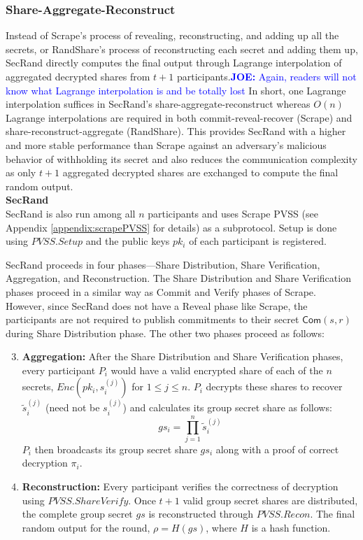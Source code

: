 \documentclass[letterpaper,twocolumn,10pt]{article}
\theoremstyle{definition}
\theoremstyle{remark}
\newcommand{\joenote}[1]{\textcolor{blue}{\textbf{JOE:} #1}}
\begin{document}
\subsubsection{Share-Aggregate-Reconstruct}
Instead of Scrape's process of revealing, reconstructing, and adding up all the secrets, or RandShare's process of reconstructing each secret and adding them up, SecRand directly computes the final output through Lagrange interpolation of aggregated decrypted shares from $t + 1$ participants.\joenote{Again, readers will not know what Lagrange interpolation is and be totally lost} In short, one Lagrange interpolation suffices in SecRand's share-aggregate-reconstruct whereas $O(n)$ Lagrange interpolations are required in both commit-reveal-recover (Scrape) and share-reconstruct-aggregate (RandShare). This provides SecRand with a higher and more stable performance than Scrape against an adversary's malicious behavior of withholding its secret and also reduces the communication complexity as only $t + 1$ aggregated decrypted shares are exchanged to compute the final random output.\\

\textbf{SecRand}\\

SecRand is also run among all $n$ participants and uses Scrape PVSS (see Appendix \ref{appendix:scrapePVSS} for details) as a subprotocol. Setup is done using $PVSS.Setup$ and the public keys $pk_i$ of each participant is registered. 

SecRand proceeds in four phases---Share Distribution, Share Verification, Aggregation, and Reconstruction. The Share Distribution and Share Verification phases proceed in a similar way as Commit and Verify phases of Scrape. However, since SecRand does not have a Reveal phase like Scrape, the participants are not required to publish commitments to their secret $\mathsf{Com}(s, r)$ during Share Distribution phase. The other two phases proceed as follows:
\begin{enumerate}
    \setcounter{enumi}{2}
    \item \textbf{Aggregation:} After the Share Distribution and Share Verification phases, every participant $P_i$ would have a valid encrypted share of each of the $n$ secrets, $Enc(pk_i, s_i^{(j)})$ for $1 \le j \le n$. $P_i$ decrypts these shares to recover $\tilde{s}_i^{(j)}$ (need not be $s_i^{(j)}$) and calculates its group secret share as follows: 
    $$ gs_i = \prod_{j=1}^{n}\tilde{s}_i^{(j)} $$
    $P_i$ then broadcasts its group secret share $gs_i$ along with a proof of correct decryption $\pi_i$.
    \item \textbf{Reconstruction:} Every participant verifies the correctness of decryption using $PVSS.ShareVerify$. Once $t+1$ valid group secret shares are distributed, the complete group secret $gs$ is reconstructed through $PVSS.Recon$. The final random output for the round, $\rho = H(gs)$, where $H$ is a hash function.
\end{enumerate}
\end{document}
